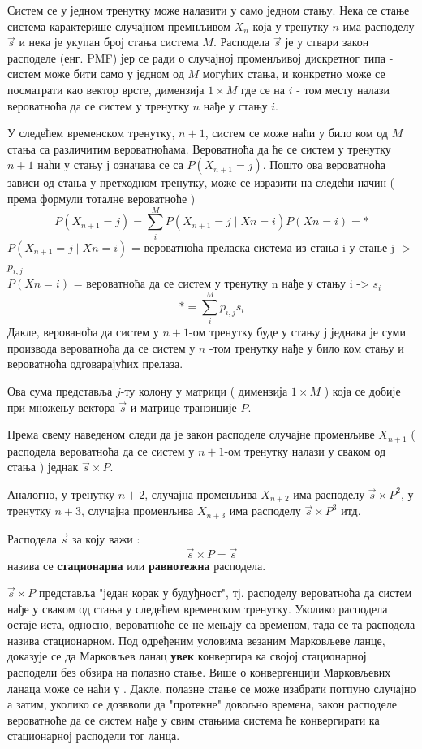 Систем се у једном тренутку може налазити у само једном стању. Нека се стање система карактерише случајном премнљивом  $X_n$ која у тренутку $n$  има расподелу $\overrightarrow{s}$ и нека је укупан број стања система $M$. Расподела $\overrightarrow{s}$ је у ствари закон расподеле (енг. PMF) јер се ради о случајној променљивој дискретног типа - систем може бити само у једном од  $M$ могућих стања, и конкретно може се посматрати као вектор врсте, димензија $1\times M$ где се на $i$ - том месту налази вероватноћа да се систем у тренутку   $n$ нађе у стању $i$.
 
У следећем временском тренутку,  $n+1$, систем се може наћи у било ком од $M$ стања са различитим вероватноћама. Вероватноћа да ће се систем у тренутку  $n+1$  наћи у стању $ј$ означава се са $P(X_{n+1} = j)$. Пошто ова вероватноћа зависи од стања у претходном тренутку, може се изразити на следећи начин ( према формули тоталне вероватноће )
$$
P(X_{n+1} = j) = \sum_{i}^{M} P(X_{n+1}=j \mid X{n}=i)P(X{n}=i) = *  $$
$P(X_{n+1}=j \mid X{n}=i)$ = вероватноћа преласка система из стања i у стање j  -> $p_{i,j} $ \\
$P(X{n}=i)$ = вероватноћа да се систем у тренутку n нађе у стању i -> $s_i$
$$
* = \sum_{i}^{M} p_{i,j}s_{i}
$$
Дакле, верованоћа да систем у  $n+1$-ом тренутку буде у стању $ј$ једнака је суми производа вероватноћа да се систем у $n$ -том тренутку нађе у било ком стању и вероватноћа одговарајућих прелаза. 

Ова сума представља $j$-ту колону у матрици ( димензија $1 \times M$ ) која се добије при множењу вектора  $\overrightarrow{s}$ и матрице транзиције $P$.

Према свему наведеном следи да је закон расподеле случајне променљиве $X_{n+1}$ ( расподела вероватноћа да се систем у  $n+1$-ом тренутку налази у сваком од стања ) једнак $\overrightarrow{s} \times P$.

Аналогно, у тренутку  $n+2$, случајна променљива   $X_{n+2}$ има расподелу  $\overrightarrow{s} \times P^2$, у тренутку $n+3$, случајна променљива   $X_{n+3}$ има расподелу  $\overrightarrow{s} \times P^3$ итд.

\begin{de}
Расподела  $\overrightarrow{s}$ за коју важи : 
$$
\overrightarrow{s} \times P = \overrightarrow{s}
$$
назива се \textbf{стационарна} или \textbf{равнотежна} расподела. 
\end{de}
$\overrightarrow{s} \times P $ представља "један корак у будуђност", тј. расподелу вероватноћа да систем нађе у сваком од стања у следећем временском тренутку. Уколико расподела остаје иста, односно, вероватноће се не мењају са временом, тада се та расподела назива стационарном. Под одређеним условима везаним Марковљеве ланце, доказује се да Марковљев ланац \textbf{увек} конвергира ка својој стационарној расподели без обзира на полазно стање. Више о конвергенцији Марковљевих ланаца може се наћи у \cite{verov6}. Дакле, полазне стање се може изабрати потпуно случајно а затим, уколико се дозвволи да "протекне" довољно времена, закон расподеле вероватноће да се систем нађе у свим стањима система ће конвергирати ка стационарној расподели тог ланца.


